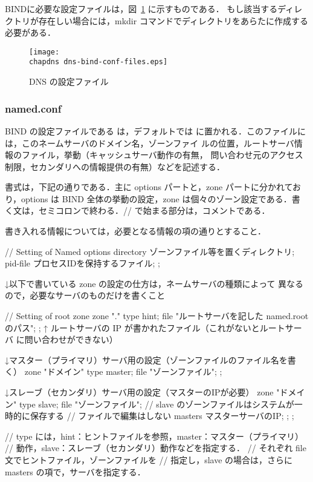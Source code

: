 BINDに必要な設定ファイルは，図~\ref{fig:05:dns-bind-conf-files} に示すものである．
もし該当するディレクトリが存在しい場合には，mkdir コマンドでディレクトリをあらたに作成する必要がある．
\begin{figure}[ht]
\begin{center}
\texttt{[image: \\chapdns dns-bind-conf-files.eps]}
\vspace*{1zh}
\caption{DNS の設定ファイル}
\label{fig:05:dns-bind-conf-files}
\end{center}
\end{figure}

\subsubsection*{named.conf}

BIND の設定ファイルである  は，デフォルトでは  
に置かれる．このファイルには，このネームサーバのドメイン名，ゾーンファイ
ルの位置，ルートサーバ情報のファイル，挙動（キャッシュサーバ動作の有無，
問い合わせ元のアクセス制限，セカンダリへの情報提供の有無）などを記述する．

書式は，下記の通りである．主に options パートと，zone パートに分かれてお
り，options は BIND 全体の挙動の設定，zone は個々のゾーン設定である．書
く文は，セミコロンで終わる．// で始まる部分は，コメントである．

書き入れる情報については，必要となる情報の項の通りとすること．

\begin{cli}
// Setting of Named
options {
        directory       ゾーンファイル等を置くディレクトリ;
        pid-file        プロセスIDを保持するファイル;
};

↓以下で書いている zone の設定の仕方は，ネームサーバの種類によって
  異なるので，必要なサーバのものだけを書くこと

// Setting of root zone
zone "." { type hint; file "ルートサーバを記した named.root のパス"; };
 ↑
 ルートサーバの IP が書かれたファイル（これがないとルートサーバ
  に問い合わせができない）


 ↓マスター（プライマリ）サーバ用の設定（ゾーンファイルのファイル名を書く）
zone "ドメイン" {
        type master;
        file "ゾーンファイル";
};

 ↓スレーブ（セカンダリ）サーバ用の設定（マスターのIPが必要）
zone "ドメイン" {
        type slave;
        file "ゾーンファイル";
        // slave のゾーンファイルはシステムが一時的に保存する
        // ファイルで編集はしない
        masters {
                マスターサーバのIP;
        };      
};

// type には，hint：ヒントファイルを参照，master：マスター（プライマリ）
// 動作，slave：スレーブ（セカンダリ）動作などを指定する．
// それぞれ file 文でヒントファイル，ゾーンファイルを
// 指定し，slave の場合は，さらに masters の項で，サーバを指定する．
\end{cli}

